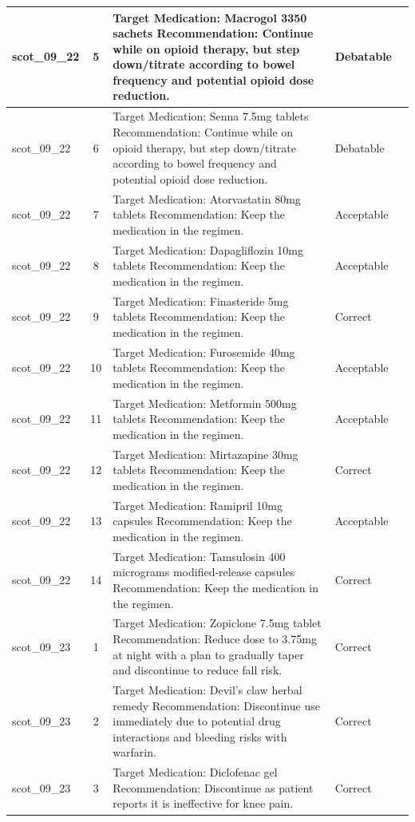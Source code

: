 \begin{longtable}{|p{1.45cm}|c|p{10.2cm}|p{1.55cm}|p{2.3cm}|}
\hline
scot\_09\_22 & 5 & Target Medication: Macrogol 3350 sachets Recommendation: Continue while on opioid therapy, but step down/titrate according to bowel frequency and potential opioid dose reduction. & Debatable &  \\
\hline
scot\_09\_22 & 6 & Target Medication: Senna 7.5mg tablets Recommendation: Continue while on opioid therapy, but step down/titrate according to bowel frequency and potential opioid dose reduction. & Debatable &  \\
\hline
scot\_09\_22 & 7 & Target Medication: Atorvastatin 80mg tablets Recommendation: Keep the medication in the regimen. & Acceptable &  \\
\hline
scot\_09\_22 & 8 & Target Medication: Dapagliflozin 10mg tablets Recommendation: Keep the medication in the regimen. & Acceptable &  \\
\hline
scot\_09\_22 & 9 & Target Medication: Finasteride 5mg tablets Recommendation: Keep the medication in the regimen. & Correct &  \\
\hline
scot\_09\_22 & 10 & Target Medication: Furosemide 40mg tablets Recommendation: Keep the medication in the regimen. & Acceptable &  \\
\hline
scot\_09\_22 & 11 & Target Medication: Metformin 500mg tablets Recommendation: Keep the medication in the regimen. & Acceptable &  \\
\hline
scot\_09\_22 & 12 & Target Medication: Mirtazapine 30mg tablets Recommendation: Keep the medication in the regimen. & Correct &  \\
\hline
scot\_09\_22 & 13 & Target Medication: Ramipril 10mg capsules Recommendation: Keep the medication in the regimen. & Acceptable &  \\
\hline
scot\_09\_22 & 14 & Target Medication: Tamsulosin 400 micrograms modified-release capsules Recommendation: Keep the medication in the regimen. & Correct &  \\
\hline
scot\_09\_23 & 1 & Target Medication: Zopiclone 7.5mg tablet Recommendation: Reduce dose to 3.75mg at night with a plan to gradually taper and discontinue to reduce fall risk. & Correct &  \\
\hline
scot\_09\_23 & 2 & Target Medication: Devil’s claw herbal remedy Recommendation: Discontinue use immediately due to potential drug interactions and bleeding risks with warfarin. & Correct &  \\
\hline
scot\_09\_23 & 3 & Target Medication: Diclofenac gel Recommendation: Discontinue as patient reports it is ineffective for knee pain. & Correct &  \\

\end{longtable}
